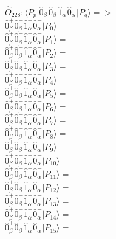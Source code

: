 \documentclass[14pt]{article}
\begin{document}
    $\hat{O}_{228}:  \langle{P_p}\vert \hat{0}_{\beta}^{+}\hat{0}_{\beta}^{+}\hat{1}_{\alpha}^{-}\hat{0}_{\alpha}^{-} \vert{P_q}\rangle => $ \\ 
    $ \hat{0}_{\beta}^{+}\hat{0}_{\beta}^{+}\hat{1}_{\alpha}^{-}\hat{0}_{\alpha}^{-} \vert{P_{0}}\rangle =  $ \\ 
    $ \hat{0}_{\beta}^{+}\hat{0}_{\beta}^{+}\hat{1}_{\alpha}^{-}\hat{0}_{\alpha}^{-} \vert{P_{1}}\rangle =  $ \\ 
    $ \hat{0}_{\beta}^{+}\hat{0}_{\beta}^{+}\hat{1}_{\alpha}^{-}\hat{0}_{\alpha}^{-} \vert{P_{2}}\rangle =  $ \\ 
    $ \hat{0}_{\beta}^{+}\hat{0}_{\beta}^{+}\hat{1}_{\alpha}^{-}\hat{0}_{\alpha}^{-} \vert{P_{3}}\rangle =  $ \\ 
    $ \hat{0}_{\beta}^{+}\hat{0}_{\beta}^{+}\hat{1}_{\alpha}^{-}\hat{0}_{\alpha}^{-} \vert{P_{4}}\rangle =  $ \\ 
    $ \hat{0}_{\beta}^{+}\hat{0}_{\beta}^{+}\hat{1}_{\alpha}^{-}\hat{0}_{\alpha}^{-} \vert{P_{5}}\rangle =  $ \\ 
    $ \hat{0}_{\beta}^{+}\hat{0}_{\beta}^{+}\hat{1}_{\alpha}^{-}\hat{0}_{\alpha}^{-} \vert{P_{6}}\rangle =  $ \\ 
    $ \hat{0}_{\beta}^{+}\hat{0}_{\beta}^{+}\hat{1}_{\alpha}^{-}\hat{0}_{\alpha}^{-} \vert{P_{7}}\rangle =  $ \\ 
    $ \hat{0}_{\beta}^{+}\hat{0}_{\beta}^{+}\hat{1}_{\alpha}^{-}\hat{0}_{\alpha}^{-} \vert{P_{8}}\rangle =  $ \\ 
    $ \hat{0}_{\beta}^{+}\hat{0}_{\beta}^{+}\hat{1}_{\alpha}^{-}\hat{0}_{\alpha}^{-} \vert{P_{9}}\rangle =  $ \\ 
    $ \hat{0}_{\beta}^{+}\hat{0}_{\beta}^{+}\hat{1}_{\alpha}^{-}\hat{0}_{\alpha}^{-} \vert{P_{10}}\rangle =  $ \\ 
    $ \hat{0}_{\beta}^{+}\hat{0}_{\beta}^{+}\hat{1}_{\alpha}^{-}\hat{0}_{\alpha}^{-} \vert{P_{11}}\rangle =  $ \\ 
    $ \hat{0}_{\beta}^{+}\hat{0}_{\beta}^{+}\hat{1}_{\alpha}^{-}\hat{0}_{\alpha}^{-} \vert{P_{12}}\rangle =  $ \\ 
    $ \hat{0}_{\beta}^{+}\hat{0}_{\beta}^{+}\hat{1}_{\alpha}^{-}\hat{0}_{\alpha}^{-} \vert{P_{13}}\rangle =  $ \\ 
    $ \hat{0}_{\beta}^{+}\hat{0}_{\beta}^{+}\hat{1}_{\alpha}^{-}\hat{0}_{\alpha}^{-} \vert{P_{14}}\rangle =  $ \\ 
    $ \hat{0}_{\beta}^{+}\hat{0}_{\beta}^{+}\hat{1}_{\alpha}^{-}\hat{0}_{\alpha}^{-} \vert{P_{15}}\rangle =  $ \\ 
    
\end{document}
